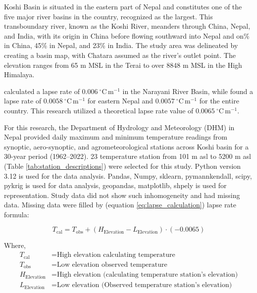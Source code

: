
Koshi Basin is situated in the eastern part of Nepal and constitutes one of the five major river basins in the country, recognized as the largest. This transboundary river, known as the Koshi River, meanders through China, Nepal, and India, with its origin in China before flowing southward into Nepal and on\% in China, 45\% in Nepal, and 23\% in India. The study area was delineated by creating a basin map, with Chatara assumed as the river's outlet point. The elevation ranges from 65 m MSL in the Terai to over 8848 m MSL in the High Himalaya.


\textcite{chand_trend_2019} calculated a lapse rate of \(0.006 \ ^\circ \mathrm{C} \, \mathrm{m}^{-1}\) in the Narayani River Basin, while \textcite{nayava_spatial_2017} found a lapse rate of \(0.0058 \ ^\circ \mathrm{C} \, \mathrm{m}^{-1}\) for eastern Nepal and \(0.0057 \ ^\circ \mathrm{C} \, \mathrm{m}^{-1}\) for the entire country. This research utilized a theoretical lapse rate value of \(0.0065 \ ^\circ \mathrm{C} \, \mathrm{m}^{-1}\).


For this research, the Department of Hydrology and Meteorology (DHM) in Nepal provided daily maximum and minimum temperature readings from synoptic, aero-synoptic, and agrometeorological stations across Koshi basin for a 30-year period (1962--2022). 23 temperature station from 101 m asl to 5200 m asl (Table \ref{tab:station_descriptions}) were selected for this study. Python version 3.12 is used for the data analysis. Pandas, Numpy, sklearn, pymannkendall, scipy, pykrig is used for data analysis, geopandas, matplotlib, shpely is used for representation. Study data did not show such inhomogeneity and had missing data. Missing data were filled by (equation \ref{eq:lapse_calculation}) lapse rate formula:

\begin{equation}
  T_{\text{cal}} = T_{\text{obs}} + (H_{\text{Elevation}} - L_{\text{Elevation}}) \cdot (-0.0065)
  \label{eq:lapse_calculation}
  \end{equation}
  
  Where, 
  \begin{align*}
  T_{\text{cal}} & = \text{High elevation calculating temperature} \\
  T_{\text{obs}} & = \text{Low elevation observed temperature} \\
  H_{\text{Elevation}} & = \text{High elevation (calculating temperature station's elevation)}  \\
  L_{\text{Elevation}} & = \text{Low elevation (Observed temperature station's elevation)}   
  \end{align*}

